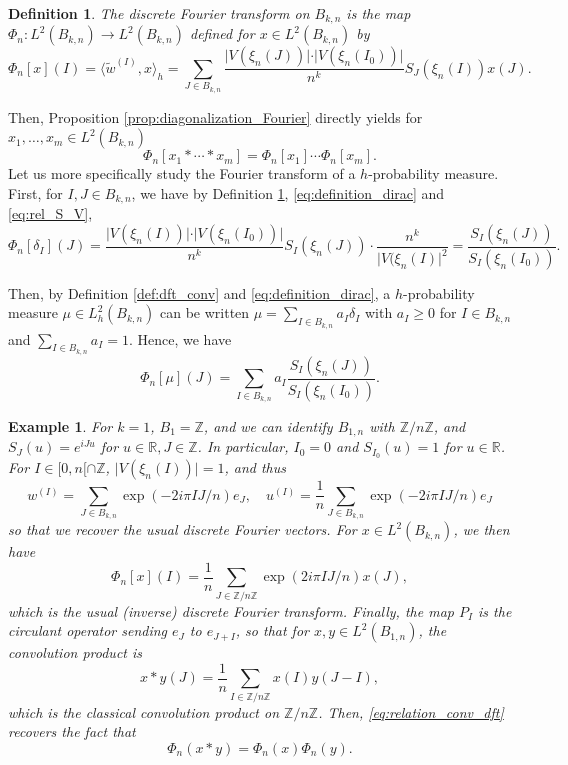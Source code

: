 \documentclass[10pt,11pt]{amsart}%
\newtheorem{definition}[theorem]{Definition}
\newtheorem{example}[theorem]{Example}
\begin{document}
\begin{definition}\label{def:Fourier_Bkn}
The discrete Fourier transform on $B_{k,n}$ is the map $\Phi_n:L^2(B_{k,n})\rightarrow L^2(B_{k,n})$ defined  for $x\in L^2(B_{k,n})$ by
$$\Phi_n[x](I)=\langle \tilde{w}^{(I)},x\rangle_{h}=\sum_{J\in B_{k,n}}\frac{\vert V(\xi_{n}(J))\vert\cdot\vert V(\xi_{n}(I_0))\vert}{n^k}S_{J}(\xi_{n}(I))x(J).$$
\end{definition}
Then, Proposition \ref{prop:diagonalization_Fourier} directly yields for $x_1,\ldots,x_m\in L^2(B_{k,n})$
\begin{equation}\label{eq:relation_conv_dft}
\Phi_n[x_1*\cdots*x_m]=\Phi_n[x_1]\cdots\Phi_n[x_m].
\end{equation}
Let us more specifically study the Fourier transform of a $h$-probability measure. First, for $I,J\in B_{k,n}$, we have by Definition \ref{def:Fourier_Bkn}, \eqref{eq:definition_dirac} and \eqref{eq:rel_S_V},
$$\Phi_n[\delta_I](J)=\frac{\vert V(\xi_{n}(I))\vert\cdot\vert V(\xi_{n}(I_0))\vert}{n^k}S_{I}(\xi_{n}(J))\cdot \frac{n^k}{\vert V(\xi_{n}(I)\vert^2}=\frac{S_{I}(\xi_{n}(J))}{S_I(\xi_{n}(I_0))}.$$

Then, by Definition \ref{def:dft_conv} and \eqref{eq:definition_dirac}, a $h$-probability measure $\mu\in L_h^2(B_{k,n})$ can be written $\mu=\sum_{I\in B_{k,n}}a_{I}\delta_I$
with $a_I\geq 0$ for $I\in B_{k,n}$ and $\sum_{I\in B_{k,n}}a_I=1$. Hence, we have 
\begin{equation}\label{eq:Fourier_probability}
\Phi_n[\mu](J)=\sum_{I\in B_{k,n}}a_{I}\frac{S_{I}(\xi_{n}(J))}{S_I(\xi_{n}(I_0))}.
\end{equation}


\begin{example}
For $k=1$, $B_{1}=\mathbb{Z}$, and we can identify $B_{1,n}$ with $\mathbb{Z}/n\mathbb{Z}$, and $S_{J}(u)=e^{iJu}$ for $u\in \mathbb{R}, J\in \mathbb{Z}$. In particular, $I_0=0$ and $S_{I_0}(u)=1$ for $u\in \mathbb{R}$. For $I\in [0,n[\cap \mathbb{Z}$, $\vert V(\xi_{n}(I))\vert=1$, and thus 
$$w^{(I)}=\sum_{J\in  B_{k,n}}\exp(-2i\pi IJ/n)e_{J},\quad u^{(I)}=\frac{1}{n}\sum_{J\in  B_{k,n}}\exp(-2i\pi IJ/n)e_{J}$$
so that we recover the usual discrete Fourier vectors. For $x\in L^2(B_{k,n})$, we then have 
$$\Phi_{n}[x](I)=\frac{1}{n}\sum_{J\in \mathbb{Z}/n\mathbb{Z}}\exp(2i\pi IJ/n)x(J),$$
which is the usual (inverse) discrete Fourier transform. Finally, the map $P_{I}$ is the circulant operator sending $e_{J}$ to $e_{J+I}$, so that for $x,y\in L^2(B_{1,n})$, the convolution product is
$$x\ast y(J)=\frac{1}{n}\sum_{I\in \mathbb{Z}/n\mathbb{Z}}x(I)y(J-I),$$
which is the classical convolution product on $\mathbb{Z}/n\mathbb{Z}$. Then, \eqref{eq:relation_conv_dft} recovers the fact that 
$$\Phi_n(x\ast y)=\Phi_n(x)\Phi_n(y).$$
\end{example}
\end{document}
